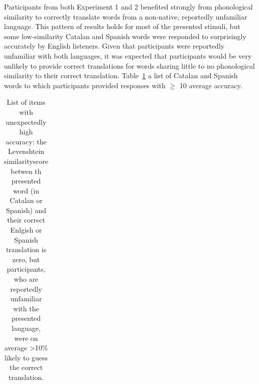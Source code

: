 \documentclass[
]{article}
\begin{document}
Participants from both Experiment 1 and 2 benefited strongly from
phonological similarity to correctly translate words from a non-native,
reportedly unfamiliar language. This pattern of results holds for most
of the presented stimuli, but some low-similarity Catalan and Spanish
words were responded to surprisingly accurately by English listeners.
Given that participants were reportedly unfamiliar with both languages,
it was expected that participants would be very unlikely to provide
correct translations for words sharing little to no phonological
similarity to their correct translation. Table~\ref{tbl-surprises} a
list of Catalan and Spanish words to which participants provided
responses with \(\geq\) 10 average accuracy.

\begin{longtable}{l|rr}

\caption{\label{tbl-surprises}List of items with unexpectedly high
accuracy: the Levenshtein similarityscore betwen th presented word (in
Catalan or Spanish) and their correct Enlgish or Spanish translation is
zero, but participants, who are reportedly unfamiliar with the presented
language, were on average \textgreater10\% likely to guess the correct
translation.}

\tabularnewline


\end{longtable}
\end{document}
